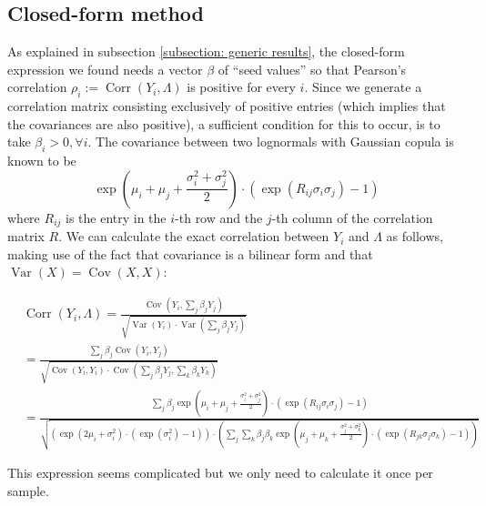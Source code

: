 \documentclass{article}
\DeclareMathOperator{\Cov}{Cov}
\DeclareMathOperator{\Corr}{Corr}
\DeclareMathOperator{\Var}{Var}
\begin{document}
\subsection{Closed-form method}
As explained in subsection \ref{subsection: generic results}, the closed-form expression we found needs a vector $\beta$ of ``seed values'' so that Pearson's correlation $\rho_i := \Corr(Y_i, \Lambda)$ is positive for every $i$. Since we generate a correlation matrix consisting exclusively of positive entries (which implies that the covariances are also positive), a sufficient condition for this to occur, is to take $\beta_i > 0, \forall i$. The covariance between two lognormals with Gaussian copula is known to be $$ \exp \left(\mu_i + \mu_j + \frac{\sigma_i^2 + \sigma_j^2}{2} \right) \cdot (\exp (R_{i j} \sigma_i \sigma_j) - 1) $$ where $R_{i j}$ is the entry in the $i$-th row and the $j$-th column of the correlation matrix $R$. We can calculate the exact correlation between $Y_i$ and $\Lambda$ as follows, making use of the fact that covariance is a bilinear form and that $\Var(X) = \Cov(X, X)$:

\begin{align*}
    &\Corr(Y_i, \Lambda) = \frac{\Cov(Y_i, \sum_j \beta_j Y_j)}{\sqrt{\Var(Y_i) \cdot \Var(\sum_j \beta_j Y_j)}} \\
    &= \frac{\sum_j \beta_j \Cov(Y_i, Y_j)}{\sqrt{\Cov(Y_i, Y_i) \cdot \Cov(\sum_j \beta_j Y_j, \sum_k \beta_k Y_k)}} \\ 
    &= \frac{\sum_j \beta_j \exp \left(\mu_i + \mu_j + \frac{\sigma_i^2 + \sigma_j^2}{2} \right) \cdot (\exp (R_{i j} \sigma_i \sigma_j) - 1)}{\sqrt{\left(\exp \left(2 \mu_i + \sigma_i^2 \right) \cdot (\exp ( \sigma_i^2) - 1)\right) \cdot \left(\sum_j \sum_k \beta_j \beta_k \exp \left(\mu_j + \mu_k + \frac{\sigma_j^2 + \sigma_k^2}{2} \right) \cdot (\exp (R_{j k} \sigma_j \sigma_k) - 1)\right)}}
\end{align*}

This expression seems complicated but we only need to calculate it once per sample. 

\end{document}
